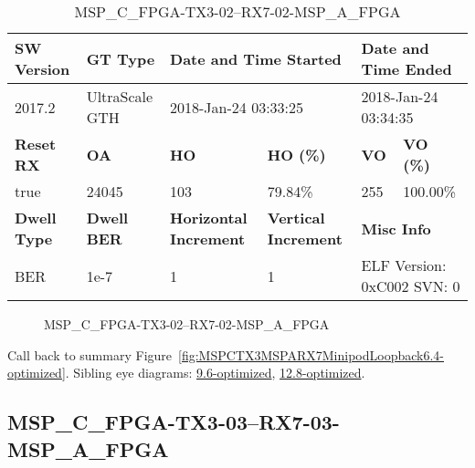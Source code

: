 \begin{table}[h]
\centering
\caption{MSP\_C\_FPGA-TX3-02--RX7-02-MSP\_A\_FPGA}
\label{tab:MSPCFPGATX302RX702MSPAFPGA6.4-optimized}
\begin{tabular}{@{}|l|l|l|l|l|l|@{}}
\toprule
\textbf{SW Version}                & \textbf{GT Type}   & \multicolumn{2}{l|}{\textbf{Date and Time Started}}            & \multicolumn{2}{l|}{\textbf{Date and Time Ended}}        \\ \midrule
2017.2                       & UltraScale GTH          & \multicolumn{2}{l|}{2018-Jan-24 03:33:25}                   & \multicolumn{2}{l|}{2018-Jan-24 03:34:35}               \\ \midrule
\textbf{Reset RX}                  & \textbf{OA} & \textbf{HO}   & \textbf{HO (\%)} & \textbf{VO} & \textbf{VO (\%)} \\ \midrule
true & 24045        & 103          & 79.84\%        & 255        & 100.00\%       \\ \midrule
\textbf{Dwell Type}                & \textbf{Dwell BER} & \textbf{Horizontal Increment} & \textbf{Vertical Increment}    & \multicolumn{2}{l|}{\textbf{Misc Info}}                  \\ \midrule
BER                            & 1e-7        & 1        & 1           & \multicolumn{2}{l|}{ELF Version: 0xC002 SVN: 0}                         \\ \bottomrule
\end{tabular}
\end{table}

\begin{figure}[h]
\caption{MSP\_C\_FPGA-TX3-02--RX7-02-MSP\_A\_FPGA} \label{fig:MSPCFPGATX302RX702MSPAFPGA6.4-optimized}
\end{figure}

Call back to summary Figure~\ref{fig:MSPCTX3MSPARX7MinipodLoopback6.4-optimized}.
Sibling eye diagrams: \hyperref[sec:MSPCFPGATX302RX702MSPAFPGA9.6-optimized]{9.6-optimized}, \hyperref[sec:MSPCFPGATX302RX702MSPAFPGA12.8-optimized]{12.8-optimized}.

\clearpage
\newpage


\subsection{MSP\_C\_FPGA-TX3-03--RX7-03-MSP\_A\_FPGA}\label{sec:MSPCFPGATX303RX703MSPAFPGA6.4-optimized}

